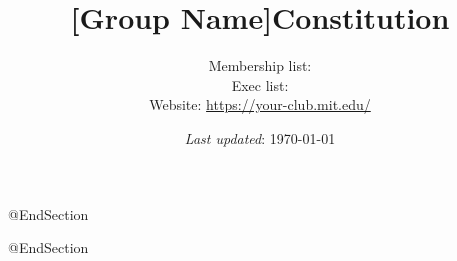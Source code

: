 \documentclass{constitution}
\def\groupname{[Group Name]}
\begin{document}
\title{\groupname Constitution}
\author{%
    Membership list:  \\
    Exec list:  \\
    Website: \url{https://your-club.mit.edu/}
}
\date{\textit{Last updated}: \today}

\maketitle

\tableofcontents @EndSection




\makeatletter
{}@EndSection
\makeatother
\end{document}
